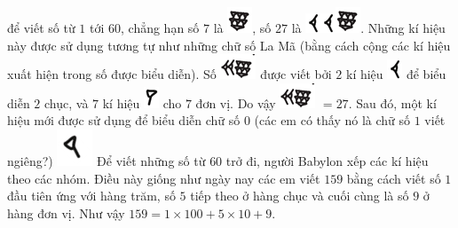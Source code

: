 	để viết số từ $1$ tới $60$, chẳng hạn số $7$ là  \includegraphics[scale=0.75]{17}, số $27$ là  \includegraphics[scale=0.75]{16}\includegraphics[scale=0.75]{16}\includegraphics[scale=0.75]{17}. 	 
	\vskip 0.1cm
	Những kí hiệu này được sử dụng tương tự như những chữ số La Mã (bằng cách cộng các kí hiệu xuất hiện trong số được biểu diễn). Số \includegraphics[scale=0.75]{18} được viết bởi $2$ kí hiệu \includegraphics[scale=0.75]{16} để biểu diễn $2$ chục, và $7$ kí hiệu \includegraphics[scale=0.75]{15}  cho $7$ đơn vị. Do vậy \includegraphics[scale=0.75]{18}  $=27$.
	\vskip 0.1cm
	Sau đó, một kí hiệu mới được sử dụng để biểu diễn chữ số $0$ (các em có thấy nó là chữ số $1$ viết ngiêng?)
	\includegraphics[scale=0.75]{15.1}
	\vskip 0.1cm
	Để viết những số từ $60$ trở đi, người Babylon xếp các kí hiệu theo các nhóm. Điều này giống như ngày nay các em viết $159$ bằng cách viết số $1$ đầu tiên ứng với hàng trăm, số $5$ tiếp theo ở hàng chục và cuối cùng là số $9$ ở hàng đơn vị. Như vậy $159 = 1 \times 100+ 5 \times 10+ 9$.
	\vskip 0.1cm
